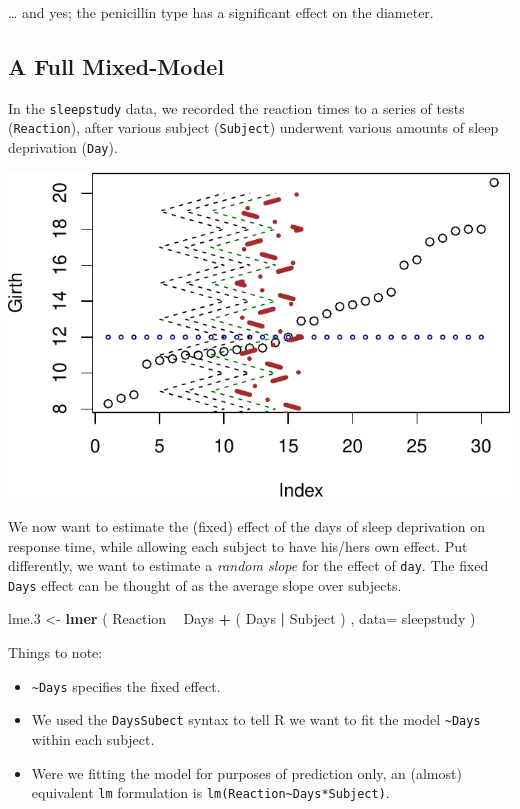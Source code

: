 \documentclass[]{book}
\newenvironment{Shaded}{\begin{snugshade}}{\end{snugshade}}
\newcommand{\KeywordTok}[1]{\textcolor[rgb]{0.13,0.29,0.53}{\textbf{#1}}}
\newcommand{\DataTypeTok}[1]{\textcolor[rgb]{0.13,0.29,0.53}{#1}}
\newcommand{\DecValTok}[1]{\textcolor[rgb]{0.00,0.00,0.81}{#1}}
\newcommand{\StringTok}[1]{\textcolor[rgb]{0.31,0.60,0.02}{#1}}
\newcommand{\OperatorTok}[1]{\textcolor[rgb]{0.81,0.36,0.00}{\textbf{#1}}}
\newcommand{\NormalTok}[1]{#1}
\providecommand{\tightlist}{%
  \setlength{\itemsep}{0pt}\setlength{\parskip}{0pt}}
\theoremstyle{definition}
\theoremstyle{definition}
\theoremstyle{definition}
\theoremstyle{remark}
\begin{document}
\ldots{} and yes; the penicillin type has a significant effect on the
diameter.

\subsection{A Full Mixed-Model}\label{a-full-mixed-model}

In the \texttt{sleepstudy} data, we recorded the reaction times to a
series of tests (\texttt{Reaction}), after various subject
(\texttt{Subject}) underwent various amounts of sleep deprivation
(\texttt{Day}).

\includegraphics[width=0.5\linewidth]{Rcourse_files/figure-latex/unnamed-chunk-211-1}

We now want to estimate the (fixed) effect of the days of sleep
deprivation on response time, while allowing each subject to have
his/hers own effect. Put differently, we want to estimate a \emph{random
slope} for the effect of \texttt{day}. The fixed \texttt{Days} effect
can be thought of as the average slope over subjects.

\begin{Shaded}
\begin{Highlighting}[]
\NormalTok{lme.}\DecValTok{3}\NormalTok{ <-}\StringTok{ }\KeywordTok{lmer}\NormalTok{ ( Reaction }\OperatorTok{~}\StringTok{ }\NormalTok{Days }\OperatorTok{+}\StringTok{ }\NormalTok{( Days }\OperatorTok{|}\StringTok{ }\NormalTok{Subject ) , }\DataTypeTok{data=}\NormalTok{ sleepstudy )}
\end{Highlighting}
\end{Shaded}

Things to note:

\begin{itemize}
\tightlist
\item
  \texttt{\textasciitilde{}Days} specifies the fixed effect.
\item
  We used the \texttt{Days\textbar{}Subect} syntax to tell R we want to
  fit the model \texttt{\textasciitilde{}Days} within each subject.
\item
  Were we fitting the model for purposes of prediction only, an (almost)
  equivalent \texttt{lm} formulation is
  \texttt{lm(Reaction\textasciitilde{}Days*Subject)}.
\end{itemize}
\end{document}
